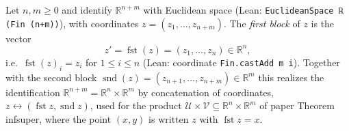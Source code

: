 \begin{definition}
Let $n,m\ge0$ and identify $\mathbb R^{n+m}$ with Euclidean space (Lean: \texttt{EuclideanSpace ℝ (Fin (n+m))}), with coordinates $z=(z_1,\dots,z_{n+m})$. The \emph{first block} of $z$ is the vector
\[
z'=\operatorname{fst}(z)=(z_1,\dots,z_n)\in\mathbb R^n ,
\]
i.e.\ $\operatorname{fst}(z)_i=z_i$ for $1\le i\le n$ (Lean: coordinate \texttt{Fin.castAdd m i}). Together with the second block $\operatorname{snd}(z)=(z_{n+1},\dots,z_{n+m})\in\mathbb R^m$ this realizes the identification $\mathbb R^{n+m}=\mathbb R^n\times\mathbb R^m$ by concatenation of coordinates, $z\leftrightarrow(\operatorname{fst}z,\operatorname{snd}z)$, used for the product $\mathcal U\times\mathcal V\subseteq\mathbb R^n\times\mathbb R^m$ of paper Theorem infsuper, where the point $(x,y)$ is written $z$ with $\operatorname{fst}z=x$.
\end{definition}
